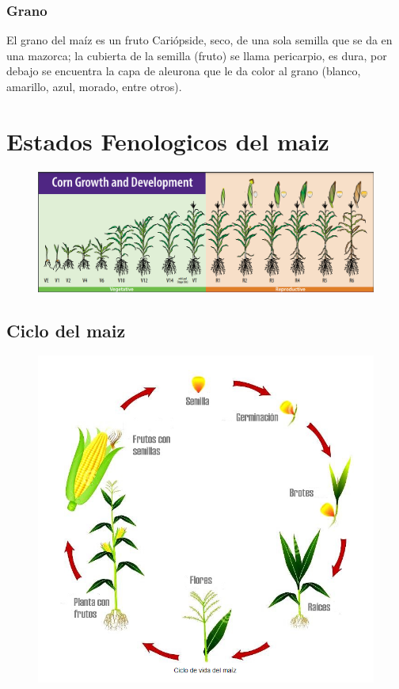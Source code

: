 \documentclass[utf8]{FrontiersinHarvard} %
\begin{document}
    
    \subsubsection{Grano} 
    El grano del maíz es un fruto Cariópside, seco, de una sola 
    semilla que se da en una mazorca; la cubierta de la semilla (fruto) 
    se llama pericarpio, es dura, por debajo se encuentra la capa de aleurona 
    que le da color al grano 
    (blanco, amarillo, azul, morado, entre otros). 


\section{Estados Fenologicos del maiz }
\begin{figure}[h]
    \centering
    \includegraphics[scale=.7]{./images/fenologia.png}
\end{figure}
\subsection{Ciclo del maiz}
\begin{figure}[h!]
    \centering
    \includegraphics[scale=0.5]{./images/ciclomaiz.png}
\end{figure}
\end{document}
